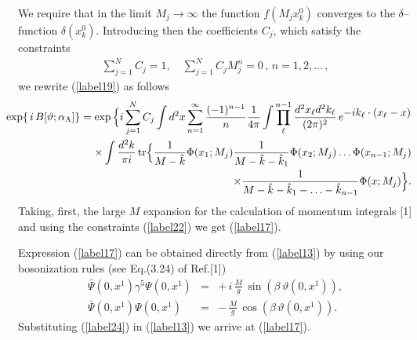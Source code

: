 \documentclass[a4paper,12pt] {article}
\begin{document}
%
We require that in the limit $M_j \to \infty$ the function
$f(M_jx^0_k)$ converges to the $\delta$--function
$\delta(x^0_k)$. Introducing then the coefficients $C_j$, which
satisfy the constraints
%
\begin{eqnarray}\label{label22}
\sum^{N}_{j = 1} C_j = 1,\quad \sum^{N}_{j = 1} C_j M^n_j = 0\,,\, n =
1, 2, \ldots\,,
\end{eqnarray}
%
we rewrite (\ref{label19}) as follows
%
\begin{eqnarray}\label{label23}
\hspace{-0.3in}&&\exp\{\,i\,B[\vartheta; \alpha_{\rm A}]\}=
\exp\Big\{i\sum^N_{j = 1}C_j\int
d^2x\sum^{\infty}_{n=1}\frac{(-1)^{n-1}}{n}\frac{1}{4\pi}\int
\prod^{n-1}_{\ell}\frac{d^2x_{\ell}d^2k_{\ell}}{(2\pi)^2}\,e^{\textstyle
-ik_{\ell}\cdot(x_{\ell} - x)} \nonumber\\
\hspace{-0.3in}&&\times\int\frac{d^2k}{\pi i}\,{\rm
tr}\Big\{\frac{1}{M - \hat{k}}\Phi(x_1; M_j)\frac{1}{M - \hat{k} -
\hat{k}_1}\Phi(x_2; M_j)\ldots\Phi(x_{n-1}; M_j) \nonumber\\
\hspace{-0.3in}&&\times\frac{1}{M - \hat{k} - \hat{k}_1 - \ldots -
\hat{k}_{n-1}}\Phi(x; M_j)\Big\}.
\end{eqnarray}
%
Taking, first, the large $M$ expansion for the calculation of momentum
integrals [1] and using the constraints (\ref{label22}) we get
(\ref{label17}).

Expression (\ref{label17}) can be obtained directly from
(\ref{label13}) by using our bosonization rules (see Eq.(3.24) of
Ref.[1])
%
\begin{eqnarray}\label{label24}
\bar{\Psi}(0,x^1)\gamma^5\Psi(0,x^1) &=&
+\,i\,\frac{M}{g}\,\sin(\beta\,\vartheta(0,x^1)),\nonumber\\
\bar{\Psi}(0,x^1)\Psi(0,x^1) &=&
-\,\frac{M}{g}\,\cos(\beta\,\vartheta(0,x^1)).
\end{eqnarray}
%
Substituting (\ref{label24}) in (\ref{label13}) we arrive at
(\ref{label17}).
\end{document}
